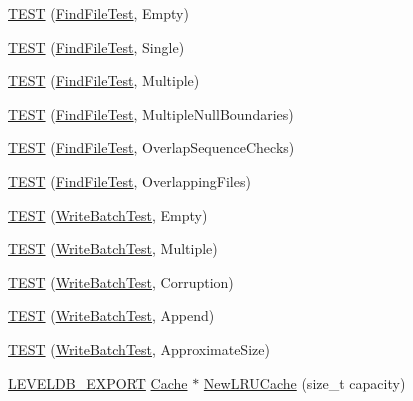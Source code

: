 \begin{DoxyCompactItemize}
\item 
\mbox{\hyperlink{namespaceleveldb_a188b103f7d0b4ade94f516f01a09aa06}{T\+E\+ST}} (\mbox{\hyperlink{classleveldb_1_1_find_file_test}{Find\+File\+Test}}, Empty)
\item 
\mbox{\hyperlink{namespaceleveldb_aede67af3ba40cb44c1ff914d7074ba48}{T\+E\+ST}} (\mbox{\hyperlink{classleveldb_1_1_find_file_test}{Find\+File\+Test}}, Single)
\item 
\mbox{\hyperlink{namespaceleveldb_a6ae343add2f7159a8d66341f271a99c2}{T\+E\+ST}} (\mbox{\hyperlink{classleveldb_1_1_find_file_test}{Find\+File\+Test}}, Multiple)
\item 
\mbox{\hyperlink{namespaceleveldb_ac9911f7a50cf3a0d5ddc4533910054a1}{T\+E\+ST}} (\mbox{\hyperlink{classleveldb_1_1_find_file_test}{Find\+File\+Test}}, Multiple\+Null\+Boundaries)
\item 
\mbox{\hyperlink{namespaceleveldb_a22fa4bca5e930976bcd623786011a180}{T\+E\+ST}} (\mbox{\hyperlink{classleveldb_1_1_find_file_test}{Find\+File\+Test}}, Overlap\+Sequence\+Checks)
\item 
\mbox{\hyperlink{namespaceleveldb_a60968bf0debd7046229d2da8d0a823c3}{T\+E\+ST}} (\mbox{\hyperlink{classleveldb_1_1_find_file_test}{Find\+File\+Test}}, Overlapping\+Files)
\item 
\mbox{\hyperlink{namespaceleveldb_a77a1389346b24fa9b5f9698400c865f6}{T\+E\+ST}} (\mbox{\hyperlink{classleveldb_1_1_write_batch_test}{Write\+Batch\+Test}}, Empty)
\item 
\mbox{\hyperlink{namespaceleveldb_af2029a94a0a17d6eb1bfec4d38b7e3a0}{T\+E\+ST}} (\mbox{\hyperlink{classleveldb_1_1_write_batch_test}{Write\+Batch\+Test}}, Multiple)
\item 
\mbox{\hyperlink{namespaceleveldb_a8021231dcd7fd48d082ecf965a2b8230}{T\+E\+ST}} (\mbox{\hyperlink{classleveldb_1_1_write_batch_test}{Write\+Batch\+Test}}, Corruption)
\item 
\mbox{\hyperlink{namespaceleveldb_a6b1521832d07ed987bc4ea6c3867bd00}{T\+E\+ST}} (\mbox{\hyperlink{classleveldb_1_1_write_batch_test}{Write\+Batch\+Test}}, Append)
\item 
\mbox{\hyperlink{namespaceleveldb_a70983b6e32498fbc5014d7887125ad71}{T\+E\+ST}} (\mbox{\hyperlink{classleveldb_1_1_write_batch_test}{Write\+Batch\+Test}}, Approximate\+Size)
\item 
\mbox{\hyperlink{export_8h_a658cd25b9dd114d894ae8ce9dddb7d3a}{L\+E\+V\+E\+L\+D\+B\+\_\+\+E\+X\+P\+O\+RT}} \mbox{\hyperlink{classleveldb_1_1_cache}{Cache}} $\ast$ \mbox{\hyperlink{namespaceleveldb_a05f8130d07c05f6ffab639fe4da0e9e8}{New\+L\+R\+U\+Cache}} (size\+\_\+t capacity)

\end{DoxyCompactItemize}
